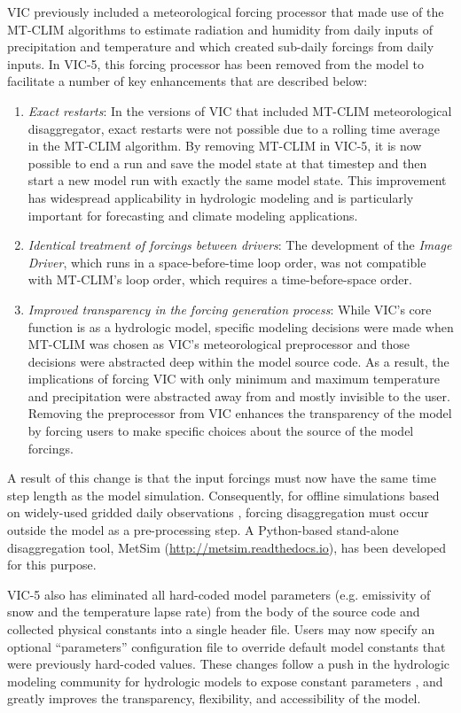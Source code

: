 \documentclass[gmd, manuscript]{copernicus}
\begin{document}
    VIC previously included a meteorological forcing processor that made use of the MT-CLIM algorithms to estimate radiation and humidity from daily inputs of precipitation and temperature and which created sub-daily forcings from daily inputs. In VIC-5, this forcing processor has been removed from the model to facilitate a number of key enhancements that are described below:

    \begin{enumerate}
      \item \textit{Exact restarts}: In the versions of VIC that included MT-CLIM meteorological disaggregator, exact restarts were not possible due to a rolling time average in the MT-CLIM algorithm. By removing MT-CLIM in VIC-5, it is now possible to end a run and save the model state at that timestep and then start a new model run with exactly the same model state. This improvement has widespread applicability in hydrologic modeling and is particularly important for forecasting and climate modeling applications.
      \item \textit{Identical treatment of forcings between drivers}: The development of the \textit{Image Driver}, which runs in a space-before-time loop order, was not compatible with MT-CLIM's loop order, which requires a time-before-space order.
      \item \textit{Improved transparency in the forcing generation process}: While VIC's core function is as a hydrologic model, specific modeling decisions were made when MT-CLIM was chosen as VIC's meteorological preprocessor and those decisions were abstracted deep within the model source code. As a result, the implications of forcing VIC with only minimum and maximum temperature and precipitation were abstracted away from and mostly invisible to the user. Removing the preprocessor from VIC enhances the transparency of the model by forcing users to make specific choices about the source of the model forcings.
    \end{enumerate}

    A result of this change is that the input forcings must now have the same time step length as the model simulation.  Consequently, for offline simulations based on widely-used gridded daily observations \citep[e.g.][]{Livneh_2015}, forcing disaggregation must occur outside the model as a pre-processing step.  A Python-based stand-alone disaggregation tool, MetSim (\url{http://metsim.readthedocs.io}), has been developed for this purpose.

    VIC-5 also has eliminated all hard-coded model parameters (e.g. emissivity of snow and the temperature lapse rate) from the body of the source code and collected physical constants into a single header file. Users may now specify an optional ``parameters'' configuration file to override default model constants that were previously hard-coded values. These changes follow a push in the hydrologic modeling community for hydrologic models to expose constant parameters \citep[e.g.][]{Mendoza_2015}, and greatly improves the transparency, flexibility, and accessibility of the model.
\end{document}
